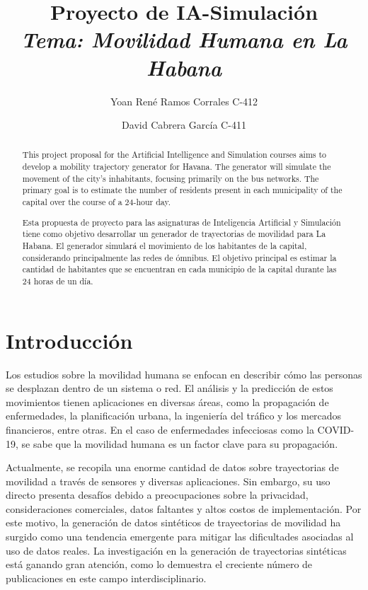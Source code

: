 \documentclass[a4paper,12pt]{article}
\title{Proyecto de IA-Simulaci\'on\\\textit{Tema: Movilidad Humana en La Habana}}
\author{Yoan Ren\'e Ramos Corrales  C-412  \and  David Cabrera Garc\'ia  C-411}
\begin{document}
\maketitle

\renewcommand{\abstractname}{Abstract}
\begin{abstract}
This project proposal for the Artificial Intelligence and Simulation courses aims to develop a mobility trajectory generator for Havana. The generator will simulate the movement of the city's inhabitants, focusing primarily on the bus networks. The primary goal is to estimate the number of residents present in each municipality of the capital over the course of a 24-hour day.
\end{abstract}
\renewcommand{\abstractname}{Resumen}
\begin{abstract}
Esta propuesta de proyecto para las asignaturas de Inteligencia Artificial y Simulación tiene como objetivo desarrollar un generador de trayectorias de movilidad para La Habana. El generador simulará el movimiento de los habitantes de la capital, considerando principalmente las redes de ómnibus. El objetivo principal es estimar la cantidad de habitantes que se encuentran en cada municipio de la capital durante las 24 horas de un día.
\end{abstract}


\tableofcontents
\newpage
\section{Introducción}
Los estudios sobre la movilidad humana se enfocan en describir cómo las personas se desplazan dentro de un sistema o red. El análisis y la predicción de estos movimientos tienen aplicaciones en diversas áreas, como la propagación de enfermedades, la planificación urbana, la ingeniería del tráfico y los mercados financieros, entre otras. En el caso de enfermedades infecciosas como la COVID-19, se sabe que la movilidad humana es un factor clave para su propagación.

Actualmente, se recopila una enorme cantidad de datos sobre trayectorias de movilidad a través de sensores y diversas aplicaciones. Sin embargo, su uso directo presenta desafíos debido a preocupaciones sobre la privacidad, consideraciones comerciales, datos faltantes y altos costos de implementación. Por este motivo, la generación de datos sintéticos de trayectorias de movilidad ha surgido como una tendencia emergente para mitigar las dificultades asociadas al uso de datos reales. La investigación en la generación de trayectorias sintéticas está ganando gran atención, como lo demuestra el creciente número de publicaciones en este campo interdisciplinario.
\end{document}
